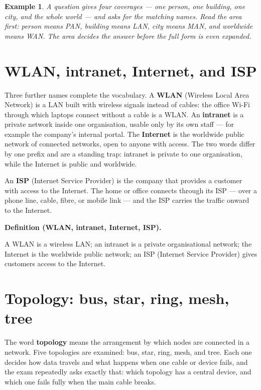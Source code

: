\documentclass[11pt]{article}
\newtheorem{example}{Example}[section]
\newenvironment{definitionbox}[1]{%
  \par\noindent\textbf{Definition (#1).}\ \itshape
}{\par\vspace{0.3em}}
\begin{document}
\begin{example}
A question gives four coverages --- one person, one building, one city, and
the whole world --- and asks for the matching names. Read the area first:
person means PAN, building means LAN, city means MAN, and worldwide means
WAN. The area decides the answer before the full form is even expanded.
\end{example}

\section{WLAN, intranet, Internet, and ISP}
Three further names complete the vocabulary. A \textbf{WLAN} (Wireless Local
Area Network) is a LAN built with wireless signals instead of cables: the
office Wi-Fi through which laptops connect without a cable is a WLAN. An
\textbf{intranet} is a private network inside one organisation, usable only
by its own staff --- for example the company's internal portal. The
\textbf{Internet} is the worldwide public network of connected networks,
open to anyone with access. The two words differ by one prefix and are a
standing trap: intranet is private to one organisation, while the Internet
is public and worldwide.

An \textbf{ISP} (Internet Service Provider) is the company that provides a
customer with access to the Internet. The home or office connects through its
ISP --- over a phone line, cable, fibre, or mobile link --- and the ISP
carries the traffic onward to the Internet.

\begin{definitionbox}{WLAN, intranet, Internet, ISP}
A WLAN is a wireless LAN; an intranet is a private organisational network;
the Internet is the worldwide public network; an ISP (Internet Service
Provider) gives customers access to the Internet.
\end{definitionbox}

\section{Topology: bus, star, ring, mesh, tree}
The word \textbf{topology} means the arrangement by which nodes are connected
in a network. Five topologies are examined: bus, star, ring, mesh, and tree.
Each one decides how data travels and what happens when one cable or device
fails, and the exam repeatedly asks exactly that: which topology has a
central device, and which one fails fully when the main cable breaks.
\end{document}
